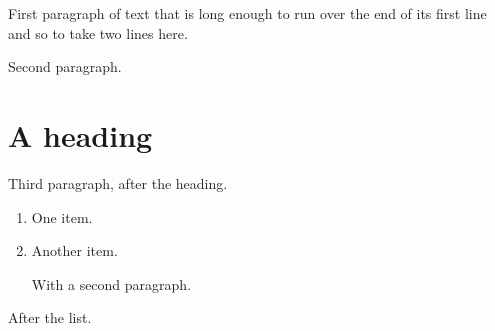 \documentclass[11pt]{article}
\begin{document}
First paragraph of text that is long enough to run over the end of its first line and so to take two lines here.

Second paragraph.
\section*{A heading}
Third paragraph, after the heading.
\begin{enumerate}
\item One item.
\item Another item.

With a second paragraph.
\end{enumerate}
After the list.
\end{document}
